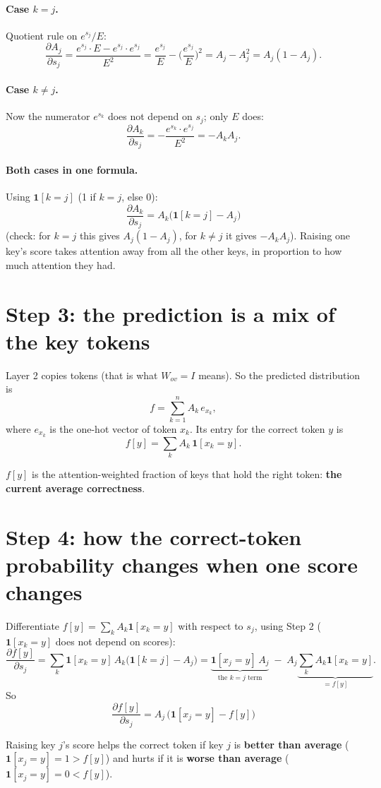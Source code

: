 \documentclass[11pt]{article}
\newcommand{\1}{\mathbf{1}}
\begin{document}
\paragraph{Case $k=j$.} Quotient rule on $e^{s_j}/E$:
\[
\frac{\partial A_j}{\partial s_j}=\frac{e^{s_j}\cdot E-e^{s_j}\cdot e^{s_j}}{E^2}
=\frac{e^{s_j}}{E}-\Big(\frac{e^{s_j}}{E}\Big)^2=A_j-A_j^2=A_j(1-A_j).
\]
\paragraph{Case $k\neq j$.} Now the numerator $e^{s_k}$ does not depend on $s_j$; only $E$ does:
\[
\frac{\partial A_k}{\partial s_j}=-\frac{e^{s_k}\cdot e^{s_j}}{E^2}=-A_kA_j .
\]
\paragraph{Both cases in one formula.} Using $\1[k=j]$ (1 if $k=j$, else 0):
\[
\boxed{\ \frac{\partial A_k}{\partial s_j}=A_k\big(\1[k=j]-A_j\big)\ }
\]
(check: for $k=j$ this gives $A_j(1-A_j)$, for $k\ne j$ it gives $-A_kA_j$). Raising one key's score
takes attention away from all the other keys, in proportion to how much attention they had.

\section{Step 3: the prediction is a mix of the key tokens}
Layer 2 copies tokens (that is what $W_{ov}=I$ means). So the predicted distribution is
\[
f=\sum_{k=1}^nA_k\,e_{x_k},
\]
where $e_{x_k}$ is the one-hot vector of token $x_k$. Its entry for the correct token $y$ is
\[
f[y]=\sum_kA_k\,\1[x_k=y] .
\]
\begin{idea}
$f[y]$ is the attention-weighted fraction of keys that hold the right token: \textbf{the current
average correctness}.
\end{idea}

\section{Step 4: how the correct-token probability changes when one score changes}
Differentiate $f[y]=\sum_kA_k\1[x_k=y]$ with respect to $s_j$, using Step 2 ($\1[x_k=y]$ does not depend
on scores):
\[
\frac{\partial f[y]}{\partial s_j}=\sum_k\1[x_k=y]\,A_k\big(\1[k=j]-A_j\big)
=\underbrace{\1[x_j=y]\,A_j}_{\text{the }k=j\text{ term}}\;-\;A_j\underbrace{\sum_kA_k\1[x_k=y]}_{=f[y]} .
\]
So
\[
\boxed{\ \frac{\partial f[y]}{\partial s_j}=A_j\,\big(\1[x_j=y]-f[y]\big)\ }
\]
\begin{idea}
Raising key $j$'s score helps the correct token if key $j$ is \textbf{better than average}
($\1[x_j=y]=1>f[y]$) and hurts if it is \textbf{worse than average} ($\1[x_j=y]=0<f[y]$).
\end{idea}
\end{document}
